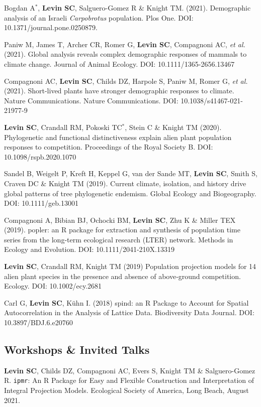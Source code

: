 \documentclass[11pt,]{article}
\begin{document}
Bogdan A\(^\ast\), \textbf{Levin SC}, Salguero-Gomez R \& Knight TM.
(2021). Demographic analysis of an Israeli \emph{Carpobrotus}
population. Plos One. DOI: 10.1371/journal.pone.0250879.

Paniw M, James T, Archer CR, Romer G, \textbf{Levin SC}, Compagnoni AC,
\emph{et al.} (2021). Global analysis reveals complex demographic
responses of mammals to climate change. Journal of Animal Ecology. DOI:
10.1111/1365-2656.13467

Compagnoni AC, \textbf{Levin SC}, Childs DZ, Harpole S, Paniw M, Romer
G, \emph{et al.} (2021). Short-lived plants have stronger demographic
responses to climate. Nature Communications. Nature Communications. DOI:
10.1038/s41467-021-21977-9

\textbf{Levin SC}, Crandall RM, Pokoski TC\(^\ast\), Stein C \& Knight
TM (2020). Phylogenetic and functional distinctiveness explain alien
plant population responses to competition. Proceedings of the Royal
Society B. DOI: 10.1098/rspb.2020.1070

Sandel B, Weigelt P, Kreft H, Keppel G, van der Sande MT, \textbf{Levin
SC}, Smith S, Craven DC \& Knight TM (2019). Current climate, isolation,
and history drive global patterns of tree phylogenetic endemism. Global
Ecology and Biogeography. DOI: 10.1111/geb.13001

Compagnoni A, Bibian BJ, Ochocki BM, \textbf{Levin SC}, Zhu K \& Miller
TEX (2019). popler: an R package for extraction and synthesis of
population time series from the long-term ecological research (LTER)
network. Methods in Ecology and Evolution. DOI: 10.1111/2041-210X.13319

\textbf{Levin SC}, Crandall RM, Knight TM (2019) Population projection
models for 14 alien plant species in the presence and absence of
above‐ground competition. Ecology. DOI: 10.1002/ecy.2681

Carl G, \textbf{Levin SC}, Kühn I. (2018) spind: an R Package to Account
for Spatial Autocorrelation in the Analysis of Lattice Data.
Biodiversity Data Journal. DOI: 10.3897/BDJ.6.e20760

\hypertarget{workshops-invited-talks}{%
\subsection{Workshops \& Invited Talks}\label{workshops-invited-talks}}

\textbf{Levin SC}, Childs DZ, Compagnoni AC, Evers S, Knight TM \&
Salguero-Gomez R. \texttt{ipmr}: An R Package for Easy and Flexible
Construction and Interpretation of Integral Projection Models.
Ecological Society of America, Long Beach, August 2021.
\end{document}
